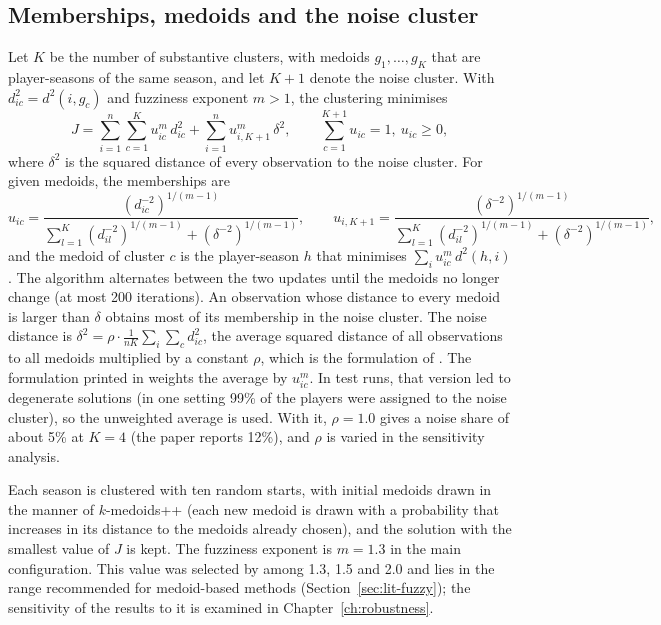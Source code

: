 \subsection{Memberships, medoids and the noise cluster}
\label{sec:method-noise}

Let $K$ be the number of substantive clusters, with medoids $g_1,\dots,g_K$ that are player-seasons of the same season, and let $K+1$ denote the noise cluster. With $d_{ic}^2=d^2(i,g_c)$ and fuzziness exponent $m>1$, the clustering minimises
\begin{equation}
	J=\sum_{i=1}^{n}\sum_{c=1}^{K}u_{ic}^{m}\,d_{ic}^{2}+\sum_{i=1}^{n}u_{i,K+1}^{m}\,\delta^{2},
	\qquad \sum_{c=1}^{K+1}u_{ic}=1,\ u_{ic}\ge 0,
\end{equation}
where $\delta^2$ is the squared distance of every observation to the noise cluster. For given medoids, the memberships are
\begin{equation}
	u_{ic}=\frac{\left(d_{ic}^{-2}\right)^{1/(m-1)}}{\sum_{l=1}^{K}\left(d_{il}^{-2}\right)^{1/(m-1)}+\left(\delta^{-2}\right)^{1/(m-1)}},
	\qquad
	u_{i,K+1}=\frac{\left(\delta^{-2}\right)^{1/(m-1)}}{\sum_{l=1}^{K}\left(d_{il}^{-2}\right)^{1/(m-1)}+\left(\delta^{-2}\right)^{1/(m-1)}},
\end{equation}
and the medoid of cluster $c$ is the player-season $h$ that minimises $\sum_i u_{ic}^{m}\,d^2(h,i)$. The algorithm alternates between the two updates until the medoids no longer change (at most 200 iterations). An observation whose distance to every medoid is larger than $\delta$ obtains most of its membership in the noise cluster. The noise distance is $\delta^{2}=\rho\cdot\frac{1}{nK}\sum_{i}\sum_{c}d_{ic}^{2}$, the average squared distance of all observations to all medoids multiplied by a constant $\rho$, which is the formulation of . The formulation printed in  weights the average by $u_{ic}^m$. In test runs, that version led to degenerate solutions (in one setting 99\% of the players were assigned to the noise cluster), so the unweighted average is used. With it, $\rho=1.0$ gives a noise share of about 5\% at $K=4$ (the paper reports 12\%), and $\rho$ is varied in the sensitivity analysis.

Each season is clustered with ten random starts, with initial medoids drawn in the manner of $k$-medoids++ (each new medoid is drawn with a probability that increases in its distance to the medoids already chosen), and the solution with the smallest value of $J$ is kept. The fuzziness exponent is $m=1.3$ in the main configuration. This value was selected by  among 1.3, 1.5 and 2.0 and lies in the range recommended for medoid-based methods (Section~\ref{sec:lit-fuzzy}); the sensitivity of the results to it is examined in Chapter~\ref{ch:robustness}.

